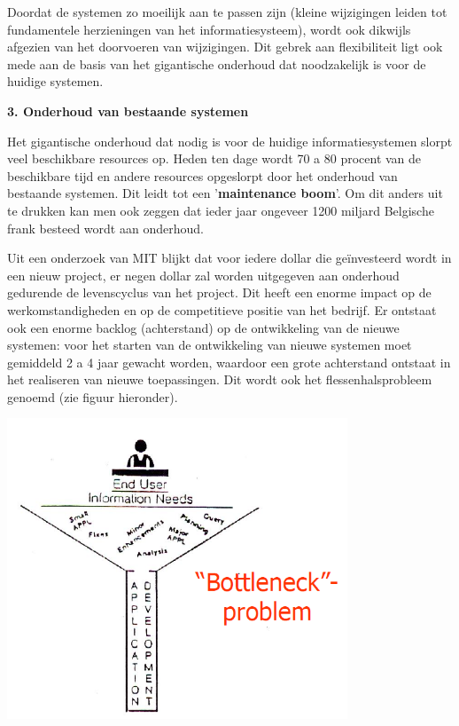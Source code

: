 Doordat de systemen zo moeilijk aan te passen zijn (kleine wijzigingen leiden tot fundamentele herzieningen van het informatiesysteem), wordt ook dikwijls afgezien van het doorvoeren van wijzigingen.
Dit gebrek aan flexibiliteit ligt ook mede aan de basis van het gigantische onderhoud dat noodzakelijk is voor de huidige systemen.

\textbf{3. Onderhoud van bestaande systemen}

Het gigantische onderhoud dat nodig is voor de huidige informatiesystemen slorpt veel beschikbare resources op. Heden ten dage wordt 70 a 80 procent van de beschikbare tijd en andere resources opgeslorpt door het onderhoud van bestaande systemen. Dit leidt tot een '\textbf{maintenance boom}'. Om dit anders uit te drukken kan men ook zeggen dat ieder jaar ongeveer 1200 miljard Belgische frank besteed wordt aan onderhoud.

Uit een onderzoek van MIT blijkt dat voor iedere dollar die geïnvesteerd wordt in een nieuw project, er negen dollar zal worden uitgegeven aan onderhoud gedurende de levenscyclus van het project. Dit heeft een enorme impact op de werkomstandigheden en op de competitieve positie van het bedrijf. Er ontstaat ook een enorme backlog (achterstand) op de ontwikkeling van de nieuwe systemen: voor het starten van de ontwikkeling van nieuwe systemen moet gemiddeld 2 a 4 jaar gewacht worden, waardoor een grote achterstand ontstaat in het realiseren van nieuwe toepassingen. Dit wordt ook het flessenhalsprobleem genoemd (zie figuur hieronder).


\begin{center}
\includegraphics[width=4in]{img/bottleneck}%
\label{bottleneck}%
\end{center}

